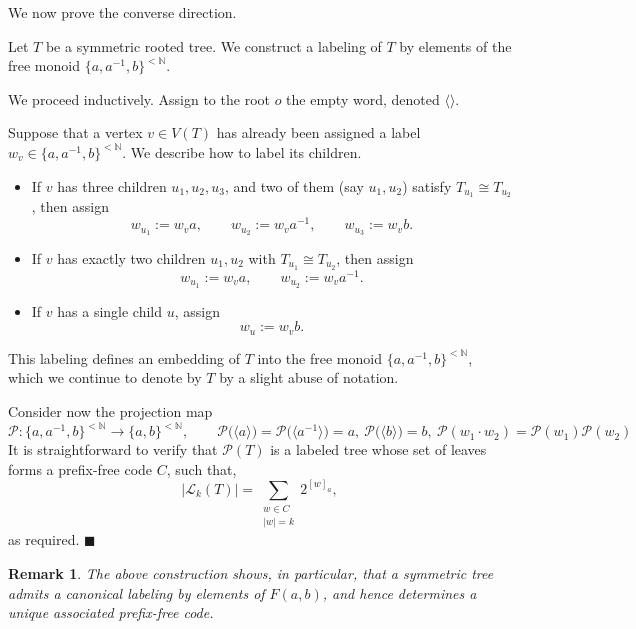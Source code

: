 \documentclass[a4,12pt]{article}%
\newtheorem{remark}[theorem]{Remark}
\begin{document}
\medskip

We now prove the converse direction.

\medskip

Let $T$ be a symmetric rooted tree. We construct a labeling of $T$ by elements of the free monoid $\{a,a^{-1},b\}^{<\mathbb{N}}$.

\medskip

We proceed inductively. Assign to the root $o$ the empty word, denoted $\langle \rangle$.

\medskip

Suppose that a vertex $v \in V(T)$ has already been assigned a label $w_v \in \{a,a^{-1},b\}^{<\mathbb{N}}$. We describe how to label its children.

\begin{itemize}
    \item If $v$ has three children $u_1,u_2,u_3$, and two of them (say $u_1,u_2$) satisfy $T_{u_1} \cong T_{u_2}$, then assign
    \[
    w_{u_1} := w_v a, 
    \qquad
    w_{u_2} := w_v a^{-1}, 
    \qquad
    w_{u_3} := w_v b.
    \]

    \item If $v$ has exactly two children $u_1,u_2$ with $T_{u_1} \cong T_{u_2}$, then assign
    \[
    w_{u_1} := w_v a,
    \qquad
    w_{u_2} := w_v a^{-1}.
    \]

    \item If $v$ has a single child $u$, assign
    \[
    w_u := w_v b.
    \]
\end{itemize}

\medskip

This labeling defines an embedding of $T$ into the free monoid $\{a,a^{-1},b\}^{<\mathbb{N}}$, which we continue to denote by $T$ by a slight abuse of notation.

\medskip

Consider now the projection map
\[
\mathcal{P} \colon \{a,a^{-1},b\}^{<\mathbb{N}} \to \{a,b\}^{<\mathbb{N}},
\qquad
\mathcal{P}\big(\langle a \rangle\big) = \mathcal{P}\big(\langle a^{-1} \rangle\big) =a, \ \mathcal{P}\big(\langle b \rangle\big) =b, \ \mathcal{P}(w_1 \cdot w_2) = \mathcal{P}(w_1)\mathcal{P}(w_2)
\]
It is straightforward to verify that $\mathcal{P}(T)$ is a labeled tree whose set of leaves forms a prefix-free code $C$, such that,
\[
\lvert \mathcal{L}_k(T) \rvert
=
\sum_{\substack{w \in C \\ \lvert w \rvert = k}} 2^{[w]_a},
\]
as required. 
$\blacksquare$

\begin{remark}
The above construction shows, in particular, that a symmetric tree admits a canonical labeling by elements of $F(a,b)$, and hence determines a unique associated prefix-free code.
\end{remark}
\end{document}
